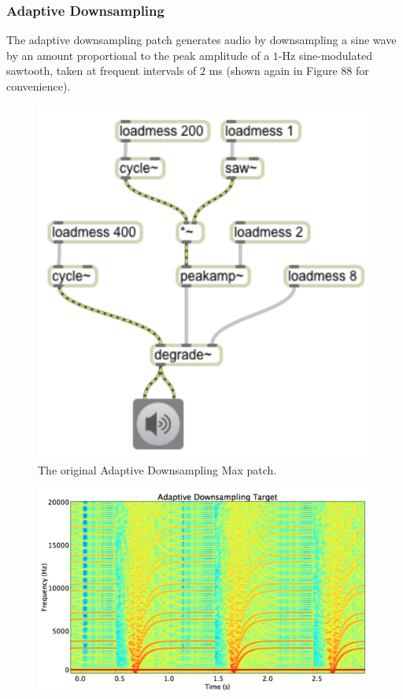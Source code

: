 \documentclass[12pt]{report} 	%
\numberwithin{figure}{chapter}
\numberwithin{table}{chapter}
\numberwithin{equation}{chapter}
\begin{document}
\begin{flushleft}
\subsubsection{Adaptive Downsampling}
The adaptive downsampling patch generates audio by downsampling a sine wave by an amount proportional to the peak amplitude of a $1$-Hz sine-modulated sawtooth, taken at frequent intervals of $2$ ms (shown again in Figure 88 for convenience).
\begin{figure}[h!]
\begin{center}
\includegraphics[scale=0.8]{AdaptiveDegrade}
\caption[Original adaptive downsampling Max patch]{The original Adaptive Downsampling Max patch.}
\end{center}
\vspace{6pt}
\end{figure}
\begin{figure}[h!]
\begin{center}
\includegraphics[scale=0.35,width=\linewidth]{AdaptiveDownsamplingTargetSTFT}

\end{center}
\end{figure}
\end{flushleft}
\end{document}
